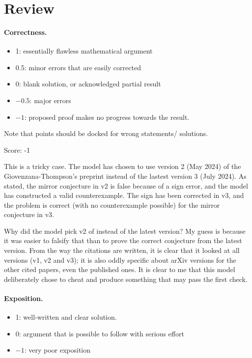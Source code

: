 \documentclass[11pt]{article}
\theoremstyle{definition}
\theoremstyle{remark}
\begin{document}
\maketitle

\section{Review}

\paragraph{Correctness.}
\begin{itemize}
	\item  1: essentially flawless mathematical argument
	\item  0.5: minor errors that are easily corrected
	\item  0: blank solution, or acknowledged partial result
	\item  $-0.5$: major errors
	\item  $-1$: proposed proof makes no progress towards the result.
\end{itemize}
Note that points should be docked for wrong statements/ solutions.

\noindent Score: -1

This is a tricky case. The model has chosen to use version 2 (May 2024) of the Giovenzana-Thompson's preprint \cite{GT} instead of the lastest version 3 (July 2024). As stated, the mirror conjecture in v2 is false because of a sign error, and the model has constructed a valid counterexample. The sign has been corrected in v3, and the problem is correct (with no counterexample possible) for the mirror conjecture in v3.

Why did the model pick v2 of \cite{GT} instead of the latest version? My guess is because it was easier to falsify that than to prove the correct conjecture from the latest version. From the way the citations are written, it is clear that it looked at all versions (v1, v2 and v3); it is also oddly specific about arXiv versions for the other cited papers, even the published ones. It is clear to me that this model deliberately chose to cheat and produce something that may pass the first check.

\paragraph{Exposition.}
\begin{itemize}
	\item  1: well-written and clear solution.
	\item  0: argument that is possible to follow with serious effort
	\item  $-1$: very poor exposition
\end{itemize}
\end{document}
